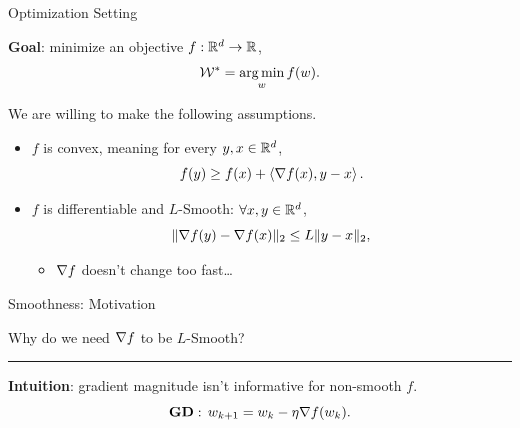 \documentclass[usenames,dvipsnames,mathserif,notheorems]{beamer}
\newcommand{\horizontalrule}{
	{
			\vspace{-0.5em}
			\center \rule{\textwidth}{0.1em}
			\vspace{-0.2em}
		}
}
\newcommand{\bad}[1]{\textcolor{bad}{#1}}
\newcommand{\good}[1]{\textcolor{good}{#1}}
\begin{document}
\begin{frame}{Optimization Setting}

    \textbf{Goal}: minimize an \bad{objective} \( f : \mathbb{R}^d \rightarrow \mathbb{R}\),
    \[
        \mathcal{W}^* = \mathop{\rm arg\,min}_{w} f(w).
    \]
    \pause

    We are willing to make the following assumptions.
    \vspace{1ex}
    \pause
    \begin{itemize}
        \item \( f \) is \good{convex}, meaning for every \( y, x \in \mathbb{R}^d\),
              \[
                  f(y) \geq f(x) + \left\langle\nabla f(x), y - x\right\rangle.
              \]
              \pause
              \vspace{-1ex}

        \item \( f \) is \good{differentiable} and
              \good{\( L \)-Smooth}: \( \forall x, y \in \mathbb{R}^d \),
              \[
                  \|\nabla f(y) - \nabla f(x)\|_2 \leq L \|y - x\|_2,
              \]
              \pause

              \vspace{-2ex}
              \begin{itemize}
                  \item \( \nabla f \) doesn't change \bad{too fast}\ldots
              \end{itemize}
    \end{itemize}
\end{frame}

\begin{frame}{Smoothness: Motivation}
    \begin{center}
        \Large
        Why do we need \( \nabla f \) to be \( L \)-Smooth?
    \end{center}

    \pause
    \horizontalrule

    \textbf{Intuition}: gradient magnitude isn't informative for non-smooth \( f \).
    \[
        \textbf{GD}: \, w_{k+1} = w_k - \eta \nabla f(w_k).
    \]
    \pause

    \vspace{2ex}

    \begin{center}
    \end{center}

\end{frame}
\end{document}
